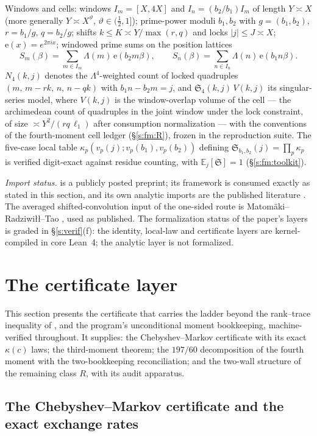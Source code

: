 \documentclass[11pt]{article}
\numberwithin{equation}{section}
\theoremstyle{definition}
\theoremstyle{remark}
\newcommand{\LL}{\Lambda}
\newcommand{\SSS}{\mathfrak{S}}
\newcommand{\e}{\mathrm{e}}
\begin{document}
Windows and cells: windows $I_m=[X,4X]$ and $I_n=(b_2/b_1)I_m$ of
length $Y\asymp X$ (more generally $Y\asymp X^{\vartheta}$,
$\vartheta\in(\tfrac12,1]$); prime-power moduli $b_1,b_2$ with
$g=(b_1,b_2)$, $r=b_1/g$, $q=b_2/g$; shifts $k\le K\asymp
Y/\max(r,q)$ and locks $|j|\le J\asymp X$; $\e(x)=e^{2\pi ix}$;
windowed prime sums on the position lattices
\[
S_m(\beta)=\sum_{m\in I_m}\LL(m)\,\e(b_2m\beta),
\qquad
S_n(\beta)=\sum_{n\in I_n}\LL(n)\,\e(b_1n\beta).
\]
$N_4(k,j)$ denotes the $\LL^4$-weighted count of locked
quadruples $(m,\,m-rk,\,n,\,n-qk)$ with $b_1n-b_2m=j$, and
$\SSS_4(k,j)\,V(k,j)$ its singular-series model, where
$V(k,j)$ is the window-overlap volume of the cell --- the
archimedean count of quadruples in the joint window under the
lock constraint, of size $\asymp Y^{2}/(rq\,\ell_1)$ after
consumption normalization --- with the conventions of the
fourth-moment cell ledger (\S\ref{s:fm:R}), frozen in the
reproduction suite. The five-case local table
$\kappa_p(v_p(j);v_p(b_1),v_p(b_2))$ defining
$\SSS_{b_1,b_2}(j)=\prod_p\kappa_p$ is verified digit-exact
against residue counting, with $\mathbb E_j[\SSS]=1$
(\S\ref{s:fm:toolkit}).

\emph{Import status.} \cite{C26} is a publicly posted
preprint; its framework is consumed exactly as stated in this
section, and its own analytic imports are the published
literature \cite{Wei52,IK,Tit86,Mon73,BGST}. The averaged
shifted-convolution input of the one-sided route is
Matom\"aki--Radziwi\l{}\l--Tao \cite{MRT}, used as
published. The formalization status of the paper's layers is
graded in \S\ref{s:verif}(f): the identity, local-law and
certificate layers are kernel-compiled in core Lean~4; the
analytic layer is not formalized.

\section{The certificate layer}\label{s:cert}

This section presents the certificate that carries the ladder
beyond the rank--trace inequality of \cite[Lem.~3.2]{C26}, and
the program's unconditional moment bookkeeping, machine-verified
throughout. It supplies: the Chebyshev--Markov certificate with
its exact $\kappa(c)$ laws; the third-moment theorem; the
$197/60$ decomposition of the fourth moment with the
two-bookkeeping reconciliation; and the two-wall structure of the
remaining class $R$, with its audit apparatus.

\subsection{The Chebyshev--Markov certificate and the exact
exchange rates}
\end{document}
